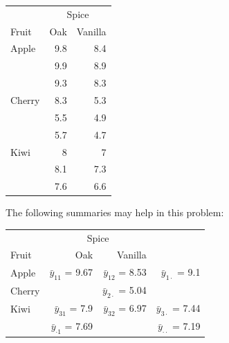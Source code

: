 \documentclass[addpoints]{examsetup}\usepackage[]{graphicx}\usepackage[]{color}
\begin{document}
\begin{questions}
\begin{table}[h]
\centering
\begin{tabular}{lrr}
   & \multicolumn{2}{c}{Spice} \\
\cline{2-3}
Fruit & Oak & Vanilla \\ \hline \hline
Apple   & 9.8 & 8.4 \\
        & 9.9 & 8.9 \\
        & 9.3 & 8.3 \\
Cherry  & 8.3 & 5.3 \\
        & 5.5 & 4.9 \\
        & 5.7 & 4.7 \\
Kiwi    & 8 & 7 \\
        & 8.1 & 7.3 \\
        & 7.6 & 6.6 \\
\hline
\end{tabular}
\end{table}

The following summaries may help in this problem:



\begin{table}[h]
\centering
\begin{tabular}{lrrr}
   & \multicolumn{2}{c}{Spice} \\
\cline{2-3}
Fruit & Oak & Vanilla \\ \cline{1-3}\cline{1-3}
Apple    & $\bar{y}_{11}$ = 9.67 & $\bar{y}_{12}$ = 8.53 & $\bar{y}_{1 \cdot}$ = 9.1 \\
Cherry   &                                                                                                     & $\bar{y}_{2 \cdot}$ = 5.04 \\
Kiwi     & $\bar{y}_{31}$ = 7.9 & $\bar{y}_{32}$ = 6.97 & $\bar{y}_{3 \cdot}$ = 7.44 \\
\cline{1-3}
         & $\bar{y}_{\cdot 1}$ = 7.69 &                                                                       & $\bar{y}_{\cdot \cdot}$ = 7.19 \\
\end{tabular}
\end{table}


\end{questions}
\end{document}
